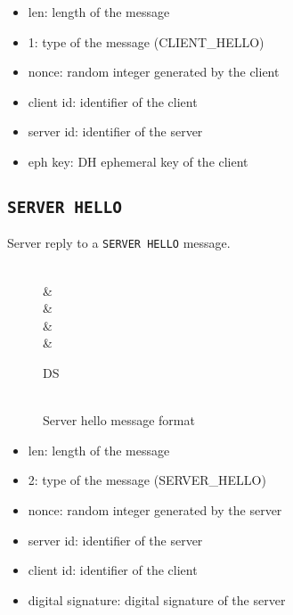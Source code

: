 \begin{itemize}
	\item len: length of the message
	\item 1: type of the message (CLIENT\_HELLO)
	\item nonce: random integer generated by the client
	\item client id: identifier of the client
	\item server id: identifier of the server
	\item eph key: DH ephemeral key of the client
\end{itemize}

\subsection{\texttt{SERVER HELLO}}
Server reply to a \texttt{SERVER HELLO} message.
\begin{figure}[h]
	\centering
	\begin{bytefield}[bitwidth=1.1em]{32}
		 \\
		&  \\
		&  \\
		&  \\
		&  \\
		\begin{rightwordgroup}{DS}
			 \\
			 \\
		\end{rightwordgroup}
	\end{bytefield}
	\caption{Server hello message format}
\end{figure}

\begin{itemize}
	\item len: length of the message
	\item 2: type of the message (SERVER\_HELLO)
	\item nonce: random integer generated by the server
	\item server id: identifier of the server
	\item client id: identifier of the client
	\item digital signature: digital signature of the server
\end{itemize}

